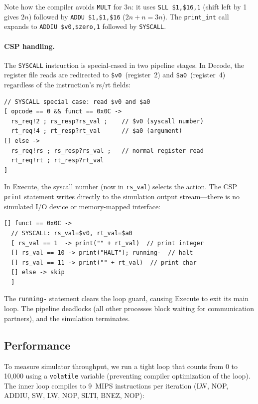 \documentclass[11pt]{article}
\begin{document}
Note how the compiler avoids \texttt{MULT} for $3n$: it uses
\mbox{\texttt{SLL~\$1,\$16,1}} (shift left by 1 gives $2n$) followed by
\texttt{ADDU~\$1,\$1,\$16} ($2n + n = 3n$).
The \texttt{print\_int} call expands to \texttt{ADDIU~\$v0,\$zero,1}
followed by \texttt{SYSCALL}.

\paragraph{CSP handling.}
The \texttt{SYSCALL} instruction is special-cased in two pipeline stages.
In Decode, the register file reads are redirected to \texttt{\$v0}~(register~2)
and \texttt{\$a0}~(register~4) regardless of the instruction's rs/rt fields:

\begin{lstlisting}[style=csp,caption={Decode: SYSCALL register redirection}]
// SYSCALL special case: read $v0 and $a0
[ opcode == 0 && funct == 0x0C ->
  rs_req!2 ; rs_resp?rs_val ;    // $v0 (syscall number)
  rt_req!4 ; rt_resp?rt_val      // $a0 (argument)
[] else ->
  rs_req!rs ; rs_resp?rs_val ;   // normal register read
  rt_req!rt ; rt_resp?rt_val
]
\end{lstlisting}

In Execute, the syscall number (now in \texttt{rs\_val}) selects the action.
The CSP \texttt{print} statement writes directly to the simulation output
stream---there is no simulated I/O device or memory-mapped interface:

\begin{lstlisting}[style=csp,caption={Execute: SYSCALL dispatch}]
[] funct == 0x0C ->
  // SYSCALL: rs_val=$v0, rt_val=$a0
  [ rs_val == 1  -> print("" + rt_val)  // print integer
  [] rs_val == 10 -> print("HALT"); running-  // halt
  [] rs_val == 11 -> print("" + rt_val)  // print char
  [] else -> skip
  ]
\end{lstlisting}

The \texttt{running-} statement clears the loop guard, causing Execute to
exit its main loop.  The pipeline deadlocks (all other processes block waiting
for communication partners), and the simulation terminates.

\subsection{Performance}

To measure simulator throughput, we run a tight loop that counts from 0 to
10,000 using a \texttt{volatile} variable (preventing compiler optimization
of the loop).  The inner loop compiles to 9~MIPS instructions per iteration
(LW, NOP, ADDIU, SW, LW, NOP, SLTI, BNEZ, NOP):
\end{document}
